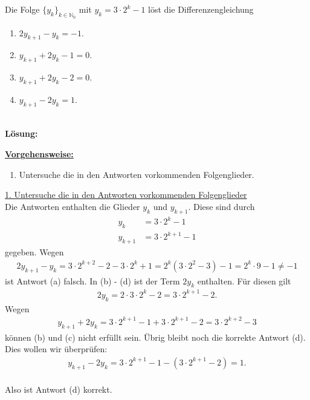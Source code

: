 \subsection*{}
Die Folge $ \{y_k\}_{k \in \mathbb{N}_0} $ mit $ y_k = 3 \cdot 2^k -1 $ löst die Differenzengleichung
\renewcommand{\labelenumi}{(\alph{enumi})}
\begin{enumerate}
	\item 
	$ 2 y_{k+1} - y_k = -1 $.
	\item
	$ y_{k+1} + 2 y_k  -1 = 0$.
	\item
	$ y_{k+1} + 2 y_k - 2 = 0 $.
	\item
	$ y_{k+1} - 2 y_k = 1$.
\end{enumerate}
\ \\
\textbf{Lösung:}
\begin{mdframed}
\underline{\textbf{Vorgehensweise:}}
\renewcommand{\labelenumi}{\theenumi.}
\begin{enumerate}
\item Untersuche die in den Antworten vorkommenden Folgenglieder.
\end{enumerate}
\end{mdframed}

\underline{1. Untersuche die in den Antworten vorkommenden Folgenglieder}\\
Die Antworten enthalten die Glieder $ y_k  $ und $ y_{k+1} $. Diese sind durch
\begin{align*}
y_k &= 3 \cdot 2^k - 1\\
y_{k+1} &= 3 \cdot 2^{k+1} -1
\end{align*}
gegeben. Wegen 
\begin{align*}
2 y_{k+1} - y_k = 
3 \cdot 2^{k+2} -2 - 3 \cdot 2^k +1
=
2^k (3\cdot 2^2 - 3) -1
=
2^k \cdot 9 - 1 \neq -1
\end{align*}
ist Antwort (a) falsch. In (b) - (d) ist der Term $ 2 y_k $ enthalten. Für diesen gilt
\begin{align*}
2 y_k =  2 \cdot 3 \cdot 2^k - 2 = 3 \cdot 2^{k+1} -2.
\end{align*}
Wegen
\begin{align*}
y_{k+1} + 2 y_k = 3 \cdot 2^{k+1} -1 + 3 \cdot 2^{k+1} -2
=
3 \cdot 2^{k+2 } -3
\end{align*}
können (b) und (c) nicht erfüllt sein. Übrig bleibt noch die korrekte Antwort (d). Dies wollen wir überprüfen:
\begin{align*}
y_{k+1} - 2 y_k =
3 \cdot 2^{k+1} -1 - (3 \cdot 2^{k+1} -2)
= 
1.
\end{align*}
\ \\
Also ist Antwort (d) korrekt.





